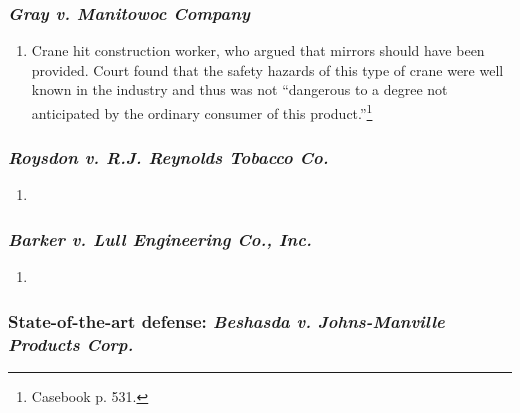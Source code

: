 \subsubsection{\emph{Gray v. Manitowoc Company}}

\begin{enumerate}
    \item Crane hit construction worker, who argued that mirrors should have 
    been provided. Court found that the safety hazards of this type of crane 
    were well known in the industry and thus was not ``dangerous to a degree not 
    anticipated by the ordinary consumer of this product.''\footnote{Casebook p. 
    531.}
\end{enumerate}

\subsubsection{\emph{Roysdon v. R.J. Reynolds Tobacco Co.}}

\begin{enumerate}
    \item %
\end{enumerate}

\subsubsection{\emph{Barker v. Lull Engineering Co., Inc.}}

\begin{enumerate}
    \item %
\end{enumerate}

\subsubsection{State-of-the-art defense: \emph{Beshasda v. Johns-Manville 
Products Corp.}}


